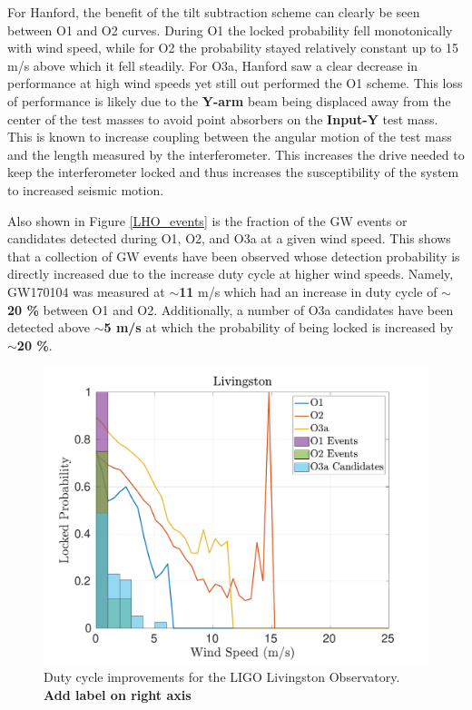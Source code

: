 \documentclass [12pt, proquest]{uwthesis}[2019]
\begin{document}
For Hanford, the benefit of the tilt subtraction scheme can clearly be seen between O1 and O2 curves. During O1 the locked probability fell monotonically with wind speed, while for O2 the probability stayed relatively constant up to 15 m/s above which it fell steadily. For O3a, Hanford saw a clear decrease in performance at high wind speeds yet still out performed the O1 scheme. This loss of performance is likely due to the \textbf{Y-arm} beam being displaced away from the center of the test masses to avoid point absorbers on the \textbf{Input-Y} test mass. This is known to increase coupling between the angular motion of the test mass and the length measured by the interferometer. This increases the drive needed to keep the interferometer locked and thus increases the susceptibility of the system to increased seismic motion. 

Also shown in Figure \ref{LHO_events} is the fraction of the GW events or candidates detected during O1, O2, and O3a at a given wind speed. This shows that a collection of GW events have been observed whose detection probability is directly increased due to the increase duty cycle at higher wind speeds. Namely, GW170104 was measured at $\sim$\textbf{11} m/s which had an increase in duty cycle of $\sim$\textbf{20 \%} between O1 and O2. Additionally, a number of O3a candidates have been detected above $\sim$\textbf{5 m/s} at which the probability of being locked is increased by $\sim$\textbf{20 \%}.

\begin{figure}%
\begin{center}
\includegraphics[width=\textwidth]{LLO_WindVsLockEvents.pdf}
\caption{Duty cycle improvements for the LIGO Livingston Observatory. \textbf{Add label on right axis}}
\label{LLO_events}
\end{center}
\end{figure}
\end{document}
